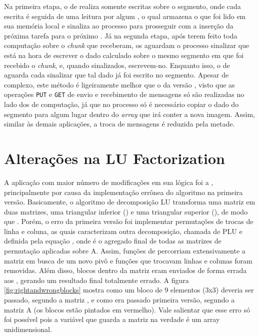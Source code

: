 Na primeira etapa, o \cluster de \IO realiza somente escritas sobre o segmento, onde cada escrita é seguida de uma leitura por algum \CC, o qual armazena o que foi lido em sua memória local e sinaliza ao processo \master para prosseguir com a inserção da próxima tarefa para o próximo \CC. Já na segunda etapa, após terem feito toda computação sobre o \textit{chunk} que receberam, os \CCs aguardam o processo \master sinalizar que está na hora de escrever o dado calculado sobre o mesmo segmento em que foi recebido o \textit{chunk}, e, quando sinalizados, escrevem-no. Enquanto isso, o \cluster de \IO aguarda cada \CC sinalizar que tal dado já foi escrito no segmento. Apesar de complexo, este método é ligeiramente melhor que o da versão \IPC, visto que as operações \texttt{PUT} e \texttt{GET} de envio e recebimento de mensagens só são realizadas no lado dos \clusters de computação, já que no processo \master só é necessário copiar o dado do segmento para algum lugar dentro do \textit{array} que irá conter a nova imagem. Assim, similar às demais aplicações, a troca de mensagens é reduzida pela metade.

\section{Alterações na LU Factorization}
\label{sec:alteracoeslu}

A aplicação com maior número de modificações em sua lógica foi a \LU, principalmente por causa da implementação errônea do algoritmo na primeira versão. Basicamente, o algoritmo de decomposição LU transforma uma matriz  em duas matrizes, uma triangular inferior () e uma triangular superior (), de modo que . Porém, o erro da primeira versão foi implementar permutações de trocas de linha e coluna, as quais caracterizam outra decomposição, chamada de PLU e definida pela equação , onde  é o agregado final de todas as matrizes de permutação aplicadas sobre A. Assim, funções de percorriam extensivamente a matriz em busca de um novo pivô e funções que trocavam linhas e colunas foram removidas. Além disso, blocos dentro da matriz eram enviados de forma errada aos \slaves, gerando um resultado final totalmente errado. A figura \ref{fig:rightandwrongblocks} mostra como um bloco de 9 elementos (3x3) deveria ser passado, segundo a matriz , e como era passado primeira versão, segundo a matriz {A} (os blocos estão pintados em vermelho). Vale salientar que esse erro só foi possível pois a variável que guarda a matriz na verdade é um array unidimensional.

